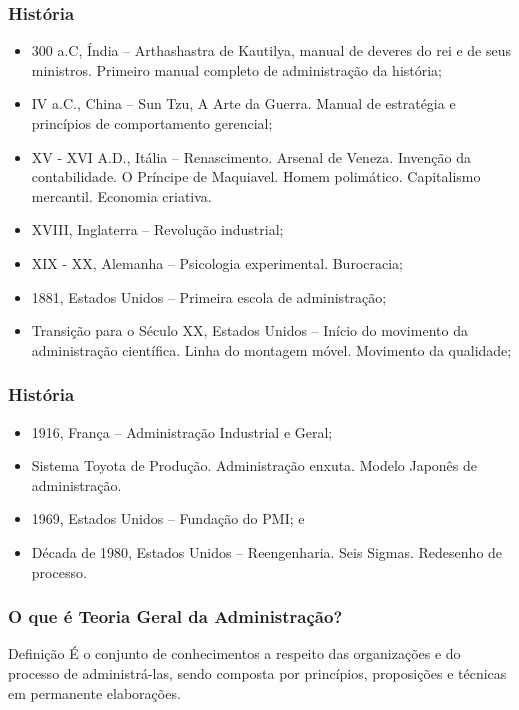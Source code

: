 \documentclass[aspectratio=169]{beamer}
\begin{document}
\begin{frame}
	\frametitle{História}

	\begin{itemize}
		\item 300 a.C, Índia -- Arthashastra de Kautilya, manual de deveres do rei e de seus ministros. Primeiro manual completo de administra\c cão da história;
		\item IV a.C., China -- Sun Tzu, A Arte da Guerra. Manual de estratégia e princípios de comportamento gerencial;
		\item XV - XVI A.D., Itália -- Renascimento. Arsenal de Veneza. Inven\c cão da contabilidade. O Príncipe de Maquiavel. Homem polimático. Capitalismo mercantil. Economia criativa.
		\item XVIII, Inglaterra -- Revolu\c cão industrial;
		\item XIX - XX, Alemanha -- Psicologia experimental. Burocracia;
		\item 1881, Estados Unidos -- Primeira escola de administra\c cão;
		\item Transi\c cão para o Século XX, Estados Unidos -- Início do movimento da administra\c cão científica. Linha do montagem móvel. Movimento da qualidade;
	\end{itemize}
\end{frame}

\begin{frame}
	\frametitle{História}

	\begin{itemize}
		\item 1916, Fran\c ca -- Administra\c cão Industrial e Geral;
		\item Sistema Toyota de Produ\c cão. Administra\c cão enxuta. Modelo Japonês de administra\c cão.
		\item 1969, Estados Unidos -- Funda\c cão do PMI; e
		\item Década de 1980, Estados Unidos -- Reengenharia. Seis Sigmas. Redesenho de processo.
	\end{itemize}
\end{frame}

\begin{frame}
	\frametitle{O que é Teoria Geral da Administra\c cão?}

	\begin{block}{Defini\c cão}
	É o conjunto de conhecimentos a respeito das organiza\c cões e do processo de administrá-las, sendo composta por princípios, proposi\c cões e técnicas em permanente elabora\c cões.
	\end{block}
\end{frame}
\end{document}
